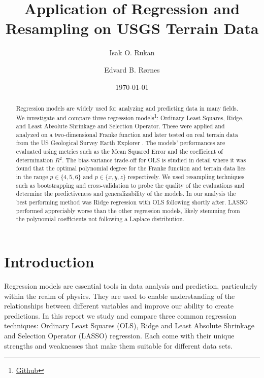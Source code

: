 \documentclass[%
reprint,
amsmath,amssymb,
aps,
pra,
]{revtex4-2}
\begin{document}
	
\title{Application of Regression and Resampling on USGS Terrain Data}
\author{Isak O. Rukan}
\author{Edvard B. Rørnes}
\date{\today}

\begin{abstract}
	Regression models are widely used for analyzing and predicting data in many fields. We investigate and compare three regression models\footnote{\href{https://github.com/EdvardRornes/FYS-STK4155/tree/main/Project1}{Github}}: Ordinary Least Squares, Ridge, and Least Absolute Shrinkage and Selection Operator. These were applied and analyzed on a two-dimensional Franke function and later tested on real terrain data from the US Geological Survey Earth Explorer \cite{USGS_EarthExplorer}. The models' performances are evaluated using metrics such as the Mean Squared Error and the coefficient of determination $R^2$. The bias-variance trade-off for OLS is studied in detail where it was found that the optimal polynomial degree for the Franke function and terrain data lies in the range $p\in\{4,5,6\}$ and $p\in\{x,y,z\}$ respectively. We used resampling techniques such as bootstrapping and cross-validation to probe the quality of the evaluations and determine the predictiveness and generalizability of the models. In our analysis the best performing method was Ridge regression with OLS following shortly after. LASSO performed appreciably worse than the other regression models, likely stemming from the polynomial coefficients not following a Laplace distribution.
\end{abstract}

\maketitle

\section{Introduction}
Regression models are essential tools in data analysis and prediction, particularly within the realm of physics. They are used to enable understanding of the relationships between different variables and improve our ability to create predictions. In this report we study and compare three common regression techniques: Ordinary Least Squares (OLS), Ridge and Least Absolute Shrinkage and Selection Operator (LASSO) regression. Each come with their unique strengths and weaknesses that make them suitable for different data sets. 
\end{document}
